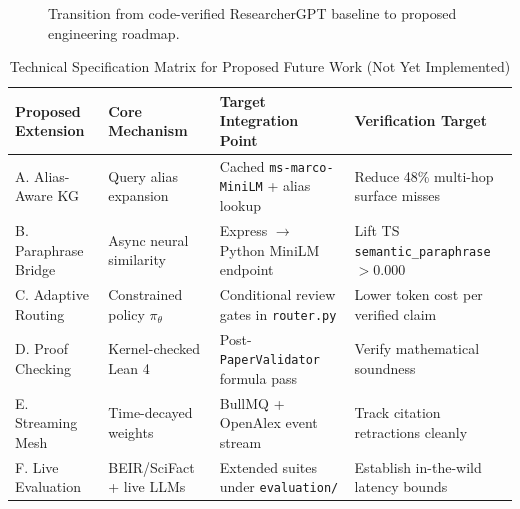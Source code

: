 \documentclass[conference]{IEEEtran}
\begin{document}
\begin{figure}[t]
\centering
{}
\caption{Transition from code-verified ResearcherGPT baseline to proposed engineering roadmap.}
\label{fig:roadmap}
\end{figure}

\begin{table}[t]
\centering
\caption{Technical Specification Matrix for Proposed Future Work (Not Yet Implemented)}
\label{tab:roadmap}
\footnotesize
\setlength{\tabcolsep}{4pt}
\begin{tabular}{p{2.7cm}p{3.0cm}p{4.3cm}p{4.8cm}}
\toprule
\textbf{Proposed Extension} & \textbf{Core Mechanism} & \textbf{Target Integration Point} & \textbf{Verification Target} \\
\midrule
A. Alias-Aware KG & Query alias expansion & Cached \texttt{ms-marco-MiniLM} + alias lookup & Reduce 48\% multi-hop surface misses \\
B. Paraphrase Bridge & Async neural similarity & Express $\rightarrow$ Python MiniLM endpoint & Lift TS \texttt{semantic\_paraphrase} $>0.000$ \\
C. Adaptive Routing & Constrained policy $\pi_\theta$ & Conditional review gates in \texttt{router.py} & Lower token cost per verified claim \\
D. Proof Checking & Kernel-checked Lean 4 & Post-\texttt{PaperValidator} formula pass & Verify mathematical soundness \\
E. Streaming Mesh & Time-decayed weights & BullMQ + OpenAlex event stream & Track citation retractions cleanly \\
F. Live Evaluation & BEIR/SciFact + live LLMs & Extended suites under \texttt{evaluation/} & Establish in-the-wild latency bounds \\
\bottomrule
\end{tabular}
\end{table}
\end{document}
